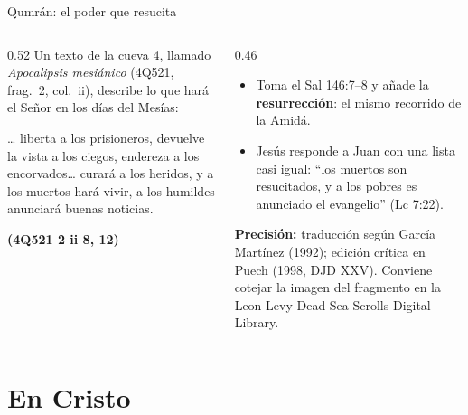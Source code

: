 \documentclass[hyperref={bookmarks=false},aspectratio=169]{beamer}
\newcommand{\fuente}[1]{\par\hfill{\upshape\bfseries\footnotesize\textcolor{azul}{#1}}}
\newcommand{\destacar}[1]{\textbf{\textcolor{azul}{#1}}}
\newcommand{\precision}[1]{{\footnotesize\color{gris}\textbf{Precisión:} #1}}
\begin{document}
\begin{frame}{Qumrán: el poder que resucita}
\begin{columns}[t,onlytextwidth]
\begin{column}{0.52\textwidth}\small
Un texto de la cueva 4, llamado \emph{Apocalipsis mesiánico} (4Q521, frag.~2, col.~ii), describe lo que hará el Señor en los días del Mesías:\par\smallskip
\begin{cita}[colback=dorado!10!papiro,colframe=dorado!80!azul,fontupper=\scriptsize\itshape]\ldots{} liberta a los prisioneros, devuelve la vista a los ciegos, endereza a los encorvados\ldots{} curará a los heridos, y a los muertos hará vivir, a los humildes anunciará buenas noticias.\fuente{(4Q521 2 ii 8, 12)}\end{cita}
\end{column}
\begin{column}{0.46\textwidth}\small
\begin{itemize}
\item Toma el Sal 146:7--8 y añade la \destacar{resurrección}: el mismo recorrido de la Amidá.
\item Jesús responde a Juan con una lista casi igual: ``los muertos son resucitados, y a los pobres es anunciado el evangelio'' (Lc 7:22).
\end{itemize}
\precision{traducción según García Martínez (1992); edición crítica en Puech (1998, DJD XXV). Conviene cotejar la imagen del fragmento en la Leon Levy Dead Sea Scrolls Digital Library.}
\end{column}
\end{columns}
\end{frame}

\section{En Cristo}
\end{document}
